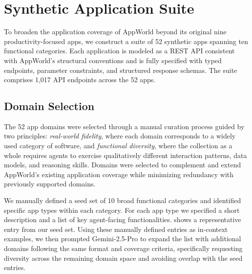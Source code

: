 \section{Synthetic Application Suite}
\label{sec:synthetic_apps}

To broaden the application coverage of AppWorld beyond its original nine productivity-focused apps, we construct a suite of 52 synthetic apps spanning ten functional categories. Each application is modeled as a REST API consistent with AppWorld's structural conventions and is fully specified with typed endpoints, parameter constraints, and structured response schemas. The suite comprises 1,017 API endpoints across the 52 apps.

\subsection{Domain Selection}

The 52 app domains were selected through a manual curation process guided by two principles: \emph{real-world fidelity}, where each domain corresponds to a widely used category of software, and \emph{functional diversity}, where the collection as a whole requires agents to exercise qualitatively different interaction patterns, data models, and reasoning skills. Domains were selected to complement and extend AppWorld's existing application coverage while minimizing redundancy with previously supported domains.

We manually defined a seed set of 10 broad functional categories and identified specific app types within each category. For each app type we specified a short description and a list of key agent-facing functionalities.  shows a representative entry from our seed set. Using these manually defined entries as in-context examples, we then prompted Gemini-2.5-Pro to expand the list with additional domains following the same format and coverage criteria, specifically requesting diversity across the remaining domain space and avoiding overlap with the seed entries.


